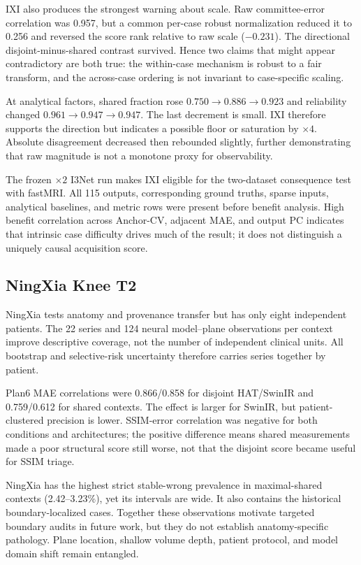 \documentclass[journal,10pt]{IEEEtran}
\begin{document}
IXI also produces the strongest warning about scale. Raw committee-error correlation was 0.957, but a common per-case robust normalization reduced it to 0.256 and reversed the score rank relative to raw scale ($-0.231$). The directional disjoint-minus-shared contrast survived. Hence two claims that might appear contradictory are both true: the within-case mechanism is robust to a fair transform, and the across-case ordering is not invariant to case-specific scaling.

At analytical factors, shared fraction rose $0.750\rightarrow0.886\rightarrow0.923$ and reliability changed $0.961\rightarrow0.947\rightarrow0.947$. The last decrement is small. IXI therefore supports the direction but indicates a possible floor or saturation by $\times4$. Absolute disagreement decreased then rebounded slightly, further demonstrating that raw magnitude is not a monotone proxy for observability.

The frozen $\times2$ I3Net run makes IXI eligible for the two-dataset consequence test with fastMRI. All 115 outputs, corresponding ground truths, sparse inputs, analytical baselines, and metric rows were present before benefit analysis. High benefit correlation across Anchor-CV, adjacent MAE, and output PC indicates that intrinsic case difficulty drives much of the result; it does not distinguish a uniquely causal acquisition score.

\subsection{NingXia Knee T2}
NingXia tests anatomy and provenance transfer but has only eight independent patients. The 22 series and 124 neural model--plane observations per context improve descriptive coverage, not the number of independent clinical units. All bootstrap and selective-risk uncertainty therefore carries series together by patient.

Plan6 MAE correlations were 0.866/0.858 for disjoint HAT/SwinIR and 0.759/0.612 for shared contexts. The effect is larger for SwinIR, but patient-clustered precision is lower. SSIM-error correlation was negative for both conditions and architectures; the positive difference means shared measurements made a poor structural score still worse, not that the disjoint score became useful for SSIM triage.

NingXia has the highest strict stable-wrong prevalence in maximal-shared contexts (2.42--3.23\%), yet its intervals are wide. It also contains the historical boundary-localized cases. Together these observations motivate targeted boundary audits in future work, but they do not establish anatomy-specific pathology. Plane location, shallow volume depth, patient protocol, and model domain shift remain entangled.
\end{document}
